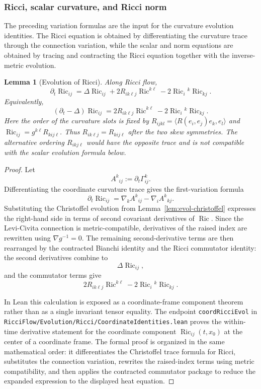 \documentclass[11pt]{article}
\theoremstyle{plain}
\newtheorem{lemma}[theorem]{Lemma}
\theoremstyle{definition}
\theoremstyle{remark}
\newcommand{\Ric}{\operatorname{Ric}}
\newcommand{\leanref}[1]{\nolinkurl{#1}}
\newcommand{\leanfile}[1]{\nolinkurl{#1}}
\newcommand{\rffile}[1]{\leanfile{#1}}
\begin{document}
\subsubsection{Ricci, scalar curvature, and Ricci norm}

The preceding variation formulas are the input for the curvature evolution
identities.  The Ricci equation is obtained by differentiating the curvature
trace through the connection variation, while the scalar and norm equations are
obtained by tracing and contracting the Ricci equation together with the
inverse-metric evolution.

\begin{lemma}[Evolution of Ricci]
\label{lem:evol-ricci}
Along Ricci flow,
\[
\partial_t\Ric_{ij}
=
\Delta\Ric_{ij}
+2R_{ik\ell j}\Ric^{k\ell}
-2\Ric_i{}^k\Ric_{kj}.
\]
Equivalently,
\[
(\partial_t-\Delta)\Ric_{ij}
=
2R_{ik\ell j}\Ric^{k\ell}
-2\Ric_i{}^k\Ric_{kj}.
\]
Here the order of the curvature slots is fixed by
\(R_{ijkl}=\langle R(e_i,e_j)e_k,e_l\rangle\) and
\(\Ric_{ij}=g^{k\ell}R_{kij\ell}\).  Thus
\(R_{ik\ell j}=R_{kij\ell}\) after the two skew symmetries.  The alternative
ordering $R_{ikj\ell}$ would have the opposite trace and is not compatible
with the scalar evolution formula below.
\end{lemma}

\begin{proof}
Let
\[
  A^k{}_{ij}:=\partial_t\Gamma^k_{ij}.
\]
Differentiating the coordinate curvature trace gives the first-variation formula
\[
  \partial_t\Ric_{ij}
  =
  \nabla_k A^k{}_{ij}
  -
  \nabla_i A^k{}_{kj}.
\]
Substituting the Christoffel evolution from Lemma~\ref{lem:evol-christoffel}
expresses the right-hand side in terms of second covariant derivatives of
\(\Ric\).  Since the Levi-Civita connection is metric-compatible, derivatives of
the raised index are rewritten using \(\nabla g^{-1}=0\).  The remaining
second-derivative terms are then rearranged by the contracted Bianchi identity
and the Ricci commutator identity: the second derivatives combine to
\[
  \Delta\Ric_{ij},
\]
and the commutator terms give
\[
  2R_{ik\ell j}\Ric^{k\ell}
  -
  2\Ric_i{}^k\Ric_{kj}.
\]

In Lean this calculation is exposed as a coordinate-frame component theorem
rather than as a single invariant tensor equality.  The endpoint
\leanref{coordRicciEvol} in
\rffile{RicciFlow/Evolution/Ricci/CoordinateIdentities.lean} proves the
within-time derivative statement for the coordinate component
\(\Ric_{ij}(t,x_0)\) at the center of a coordinate frame.  The formal proof is
organized in the same mathematical order: it differentiates the Christoffel
trace formula for Ricci, substitutes the connection variation, rewrites the
raised-index terms using metric compatibility, and then applies the contracted
commutator package to reduce the expanded expression to the displayed heat
equation.
\end{proof}
\end{document}

